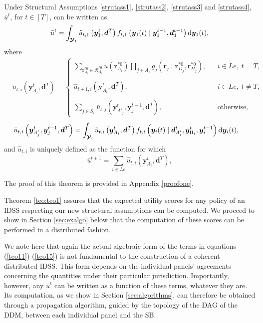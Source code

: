 \begin{theorem}
\label{teo:teo1}
Under Structural Assumptions \ref{strutass1}, \ref{strutass2}, \ref{strutass3} and \ref{strutass4}, $\bar{u}^t$, for $t\in[T]$, can be written as
\begin{equation}
\label{teo11}
\bar{u}^{t}=\int_{\bm{\mathcal{Y}}_1}\tilde{u}_{t,1}\left(\bm{y}^t_1, \bm{d}^{T}\right)f_{t,1}\left(\bm{y}_1(t)\;|\;\bm{y}^{t-1}_1,\bm{d}^{t-1}_1\right)\dr \bm{y}_1(t),
\end{equation}
where
\begin{align}
&\tilde{u}_{t,i}\left(\bm{y}^t_{A_i},  \bm{d}^T\right)=\left\{
\begin{array}{lcl}
\label{teo14}
\sum_{\bm{r}_{A_i}^{*0}\in \bm{\mathcal{R}}_{A_i}^{*0}}u\left(\bm{r}_{A_i}^{*0}\right)\prod_{j\in A_i}g_j\left(\bm{r}_j\;|\;\bm{r}_{D_j}^{*0},\bm{r}_{\Pi_j}^{*0}\right), &&i\in Le,\; t=T,\\
\\
\hat{u}_{t+1,i}\left(\bm{y}^t_{A_i},\bm{d}^T\right), &&i\in Le,\; t\neq T,\\
\\
\sum_{j\in S_i}\bar{u}_{t,j}\left(\bm{y}^t_{A'_j}, \bm{y}^{t-1}_j, \bm{d}^{T}\right), &&\mbox{otherwise},
\end{array}
\right.
\end{align}
\begin{align}
&\bar{u}_{t,i}\left(\bm{y}^t_{A'_j}, \bm{y}^{t-1}_j, \bm{d}^{T}\right)=\int_{\bm{\mathcal{Y}}_i}\tilde{u}_{t,i}\left(\bm{y}^t_{A_i},  \bm{d}^T\right)f_{t,i}\left(\bm{y}_i(t)\;|\;\bm{d}^t_{A'_i}, \bm{y}^t_{\Pi_i}, \bm{y}^{t-1}_i\right)\dr \bm{y}_i(t),\label{teo13}
\end{align}
and $\hat{u}_{t,i}$ is uniquely defined as the function for which 
\begin{equation}
\bar{u}^{t+1}=\sum_{i\in Le}\hat{u}_{t,i}(\bm{y}^t_{A_i},\bm{d}^T),
\label{teo15}
\end{equation}
\end{theorem}
The proof of this theorem is provided in Appendix \ref{proofone}.

Theorem \ref{teo:teo1} assures that the expected utility scores for any policy of an IDSS respecting our new structural assumptions can be computed. We proceed to show in Section \ref{sec:exalgo} below that the computation of these scores can be performed in a distributed fashion.

We note here that again the actual algebraic form of the terms in equations (\ref{teo11})-(\ref{teo15}) is not fundamental to the construction of a coherent distributed IDSS. This form depends on the individual panels' agreements concerning the quantities under their particular jurisdiction. Importantly, however, any $\bar{u}^t$ can be written as a function of these terms, whatever they are. Its computation, as we  show in Section \ref{sec:algorithms}, can therefore be obtained through a propagation algorithm, guided by the topology of the DAG of the DDM, between each individual panel and the SB.

